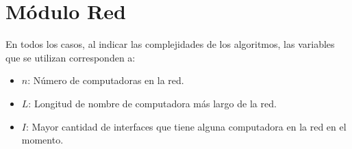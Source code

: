 \section{M\'{o}dulo Red}

  En todos los casos, al indicar las complejidades de los algoritmos, las variables que se utilizan corresponden a:
  \vspace{-0.5em}\begin{itemize}
    \item $n$: N\'umero de computadoras en la red.
    \item $L$: Longitud de nombre de computadora m\'as largo de la red.
    \item $I$: Mayor cantidad de interfaces que tiene alguna computadora en la red en el momento.
  \end{itemize}



